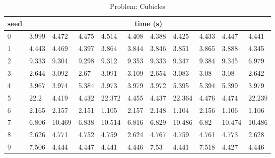 \documentclass{article}
\begin{document}
\begin{table}
\begin{center}
\begin{tabular}{ p{0.5cm}| p{1cm} p{1cm} p{1cm} p{1cm} p{1cm} p{1cm} p{1cm} p{1cm} p{1cm} p{1cm} }
seed & \multicolumn{10}{c}{time (s)} \\
\hline
0 & 3.999 & 4.472 & 4.475 & 4.514 & 4.408 & 4.388 & 4.425 & 4.433 & 4.447 & 4.441 \\
1 & 4.443 & 4.469 & 4.397 & 3.864 & 3.844 & 3.846 & 3.851 & 3.865 & 3.888 & 4.345 \\
2 & 9.333 & 9.304 & 9.298 & 9.312 & 9.353 & 9.333 & 9.347 & 9.384 & 9.345 & 6.979 \\
3 & 2.644 & 3.092 & 2.67 & 3.091 & 3.109 & 2.654 & 3.083 & 3.08 & 3.08 & 2.642 \\
4 & 3.967 & 3.974 & 5.384 & 3.973 & 3.979 & 3.972 & 5.395 & 5.394 & 5.399 & 3.979 \\
5 & 22.2 & 4.419 & 4.432 & 22.372 & 4.455 & 4.437 & 22.364 & 4.476 & 4.474 & 22.239 \\
6 & 2.165 & 2.157 & 2.151 & 1.105 & 2.157 & 2.148 & 1.104 & 2.156 & 1.106 & 1.106 \\
7 & 6.806 & 10.469 & 6.838 & 10.514 & 6.816 & 6.829 & 10.486 & 6.82 & 10.474 & 10.486 \\
8 & 2.626 & 4.771 & 4.752 & 4.759 & 2.624 & 4.767 & 4.759 & 4.761 & 4.773 & 2.628 \\
9 & 7.506 & 4.444 & 4.447 & 4.441 & 4.446 & 7.53 & 4.441 & 7.518 & 4.427 & 4.446
\end{tabular}
\end{center}
\caption{Problem: Cubicles}
\end{table}
\end{document}
